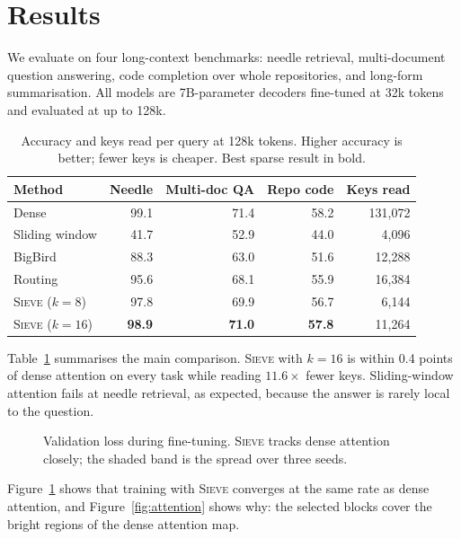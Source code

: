\section{Results}
\label{sec:results}

We evaluate on four long-context benchmarks: needle retrieval, multi-document
question answering, code completion over whole repositories, and long-form
summarisation. All models are 7B-parameter decoders fine-tuned at 32k tokens
and evaluated at up to 128k.

\begin{table}[ht]
  \centering
  \caption{Accuracy and keys read per query at 128k tokens. Higher accuracy is
  better; fewer keys is cheaper. Best sparse result in bold.}
  \label{tab:results}
  \begin{tabular}{lrrrr}
    \toprule
    Method        & Needle & Multi-doc QA & Repo code & Keys read \\
    \midrule
    Dense         & 99.1   & 71.4         & 58.2      & 131{,}072 \\
    Sliding window & 41.7  & 52.9         & 44.0      & 4{,}096   \\
    BigBird       & 88.3   & 63.0         & 51.6      & 12{,}288  \\
    Routing       & 95.6   & 68.1         & 55.9      & 16{,}384  \\
    \midrule
    \textsc{Sieve} ($k=8$)  & 97.8 & 69.9 & 56.7 & 6{,}144 \\
    \textsc{Sieve} ($k=16$) & \textbf{98.9} & \textbf{71.0} & \textbf{57.8} & 11{,}264 \\
    \bottomrule
  \end{tabular}
\end{table}

Table~\ref{tab:results} summarises the main comparison. \textsc{Sieve} with
$k = 16$ is within 0.4 points of dense attention on every task while reading
$11.6\times$ fewer keys. Sliding-window attention fails at needle retrieval,
as expected, because the answer is rarely local to the question.

\begin{figure}[ht]
  \centering
  
  \caption{Validation loss during fine-tuning. \textsc{Sieve} tracks dense
  attention closely; the shaded band is the spread over three seeds.}
  \label{fig:loss}
\end{figure}

Figure~\ref{fig:loss} shows that training with \textsc{Sieve} converges at the
same rate as dense attention, and Figure~\ref{fig:attention} shows why: the
selected blocks cover the bright regions of the dense attention map.

